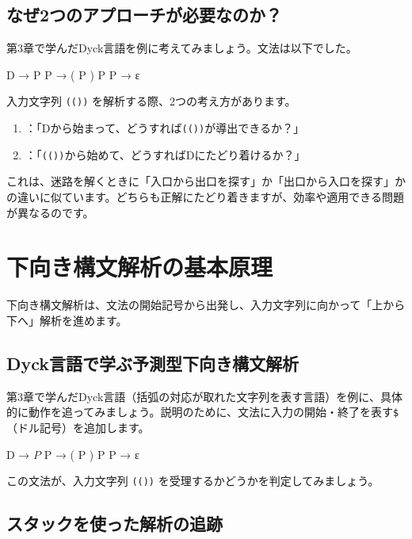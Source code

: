 \subsection{なぜ2つのアプローチが必要なのか？}

第3章で学んだDyck言語を例に考えてみましょう。文法は以下でした。

\begin{codescreen}{}
D → P
P → ( P ) P
P → ε
\end{codescreen}

入力文字列 \texttt{(())} を解析する際、2つの考え方があります。

\begin{enumerate}
\item
  ：「Dから始まって、どうすれば\texttt{(())}が導出できるか？」
\item
  ：「\texttt{(())}から始めて、どうすればDにたどり着けるか？」
\end{enumerate}

これは、迷路を解くときに「入口から出口を探す」か「出口から入口を探す」かの違いに似ています。どちらも正解にたどり着きますが、効率や適用できる問題が異なるのです。

\section{下向き構文解析の基本原理}

下向き構文解析は、文法の開始記号から出発し、入力文字列に向かって「上から下へ」解析を進めます。

\subsection{Dyck言語で学ぶ予測型下向き構文解析}

第3章で学んだDyck言語（括弧の対応が取れた文字列を表す言語）を例に、具体的に動作を追ってみましょう。説明のために、文法に入力の開始・終了を表す\texttt{\$}（ドル記号）を追加します。

\begin{codescreen}{}
D → $ P $
P → ( P ) P
P → ε
\end{codescreen}

この文法が、入力文字列 \texttt{(())} を受理するかどうかを判定してみましょう。

\subsection{スタックを使った解析の追跡}

